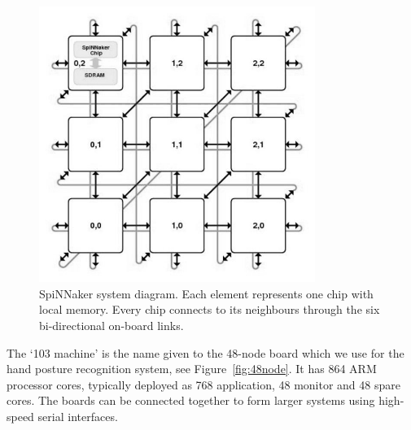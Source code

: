 \begin{figure}
\centering
	\includegraphics[width=0.8\textwidth]{pics/mesh_ctiff.jpg}
	\caption{SpiNNaker system diagram.
	Each element represents one chip with local memory.
	Every chip connects to its neighbours through the six bi-directional on-board links. }
	\label{fig:sysdia}
\end{figure}

%

The `103 machine' is the name given to the 48-node board which we use for the hand posture recognition system, see Figure~\ref{fig:48node}.
It has 864 ARM processor cores, typically deployed as 768 application, 48 monitor and 48 spare cores. 
The boards can be connected together to form larger systems using high-speed serial interfaces. 

